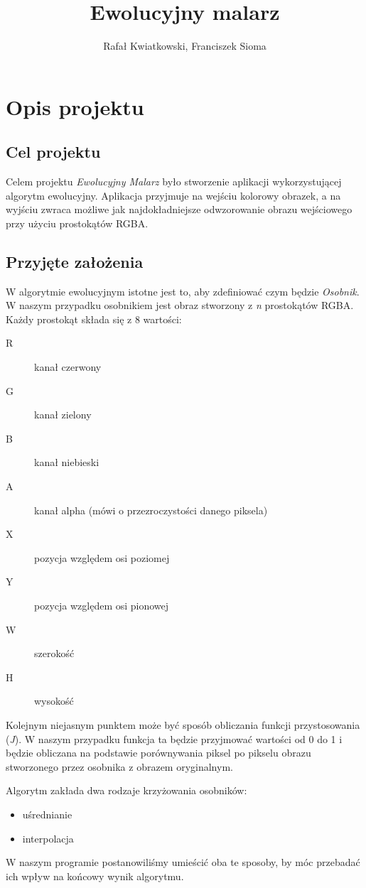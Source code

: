 \documentclass{article}
\title{Ewolucyjny malarz }%
\author{Rafał Kwiatkowski, Franciszek Sioma}
\begin{document}
\maketitle

\section{Opis projektu}
\subsection{Cel projektu}
Celem projektu {\it Ewolucyjny Malarz} było stworzenie aplikacji wykorzystującej algorytm ewolucyjny. Aplikacja przyjmuje na wejściu kolorowy obrazek, a na wyjściu zwraca możliwe jak najdokładniejsze odwzorowanie obrazu wejściowego przy użyciu prostokątów RGBA. 

\subsection{Przyjęte założenia}
W algorytmie ewolucyjnym istotne jest to, aby zdefiniować czym będzie {\it Osobnik}. W naszym przypadku osobnikiem jest obraz stworzony z {\it n} prostokątów RGBA. Każdy prostokąt składa się z 8 wartości: 
\begin{description}
    \item[R] kanał czerwony
    \item[G] kanał zielony
    \item[B] kanał niebieski
    \item[A] kanał alpha (mówi o przezroczystości danego piksela)
    \item[X] pozycja względem osi poziomej
    \item[Y] pozycja względem osi pionowej
    \item[W] szerokość
    \item[H] wysokość       
\end{description}

Kolejnym niejasnym punktem może być sposób obliczania funkcji przystosowania ({\it J}). W naszym przypadku funkcja ta będzie przyjmować wartości od 0 do 1 i będzie obliczana na podstawie porównywania piksel po pikselu obrazu stworzonego przez osobnika z obrazem oryginalnym.

Algorytm zakłada dwa rodzaje krzyżowania osobników:
\begin{itemize}
    \item uśrednianie
    \item interpolacja
\end{itemize}
W naszym programie postanowiliśmy umieścić oba te sposoby, by móc przebadać ich wpływ na końcowy wynik algorytmu.
\end{document}
